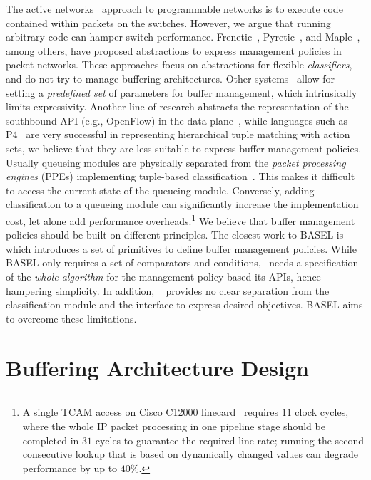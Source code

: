 \documentclass{article}
\newcommand{\barch}{BASEL}
\begin{document}
The active networks~\cite{TennenhouseW96} approach to programmable networks is to execute code contained within packets on the switches. However, we argue that running arbitrary code can hamper switch performance.
Frenetic~\cite{FosterHFMRSW11}, Pyretic~\cite{MonsantoRFRW13}, and Maple~\cite{VoellmyWYFH13}, among others, have proposed 
abstractions to express management policies in packet networks. These approaches focus on abstractions for flexible \emph{classifiers}, and do not try to manage buffering architectures.
Other systems~\cite{SouleBMPKSF14,ShiehKGK10,FergusonGLFK13} allow for setting a \emph{predefined set} of parameters for
buffer management, which intrinsically limits expressivity. 
Another line of research abstracts the representation of the southbound API (e.g., OpenFlow) in the data plane~\cite{BosshartDGIMRSTVVW14,Song13,KozanitisHSV10}, while languages such as P4~\cite{BosshartDGIMRSTVVW14} are very successful in representing hierarchical tuple matching with action sets, we believe that they are less suitable to express buffer management policies. Usually queueing modules are physically separated from the \emph{packet processing engines}
(PPEs) implementing tuple-based classification~\cite{qfp,crs1}. This makes it difficult to access the current state of the queueing module. Conversely, adding classification to a queueing module can significantly increase the implementation cost, let alone add performance overheads.\footnote{A single TCAM access on Cisco C12000 linecard~\cite{pinnacle}
requires $11$ clock cycles, where the whole IP packet processing in one pipeline stage should be completed in $31$ cycles to guarantee the required line rate; running the second consecutive lookup that is based on dynamically changed values can degrade performance by up to $40\%$.}
We believe that buffer management policies should be built on different principles. 
The closest work to \barch{} is ~\cite{SivaramanWSB13} which introduces a set of primitives to define buffer management policies. While \barch{} only requires a set of comparators and conditions,~\cite{SivaramanWSB13} needs a specification
of the \emph{whole algorithm} for the management policy based its APIs, hence hampering simplicity. In addition, ~\cite{SivaramanWSB13} 
provides no clear separation from the classification module and the interface to express desired objectives. 
\barch{} aims to overcome these limitations.

\section{Buffering Architecture Design}\label{sec:overv-buff-arch}
\end{document}
